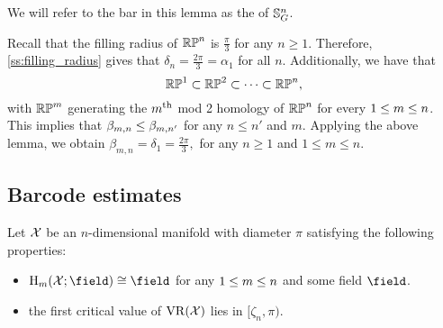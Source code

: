 We will refer to the bar in this lemma as the  of $\mathbb{S}^n_G$.

\example Recall that the filling radius of $\mathbb{RP}^n$ is $\frac{\pi}{3}$ for any $n \geq 1$.
Therefore, \cref{ss:filling_radius} gives that $\delta_n = \tfrac{2\pi}{3} = \alpha_1$ for all $n$.
Additionally, we have that
\[
\mathbb{RP}^1 \subset \mathbb{RP}^2 \subset \dots \subset \mathbb{RP}^n,
\]
with $\mathbb{RP}^m$ generating the $m^{\mathrm{th}}$ mod 2 homology of $\mathbb{RP}^n$ for every $1 \leq m \leq n$.
This implies that $\beta_{m, n} \leq \beta_{m, n'}$ for any $n\leq n'$ and $m$.
Applying the above lemma, we obtain $\beta_{m,n} = \delta_1 = \tfrac{2\pi}{3},$ for any $n\geq 1$ and $1 \leq m \leq n$.

\subsection{Barcode estimates}
\label{subsub:general_barcodes}

Let $\mathcal{X}$ be an $n$-dimensional manifold with diameter $\pi$ satisfying the following properties:
\begin{itemize}
    \item $\mathrm{H}_\degp (\cX; \field)\cong \field$ for any $1\leq m\leq n$ and some field $\field$.
    \item the first critical value of $\operatorname{VR}(\mathcal{X})$ lies in $[\zeta_n, \pi)$.
\end{itemize}


